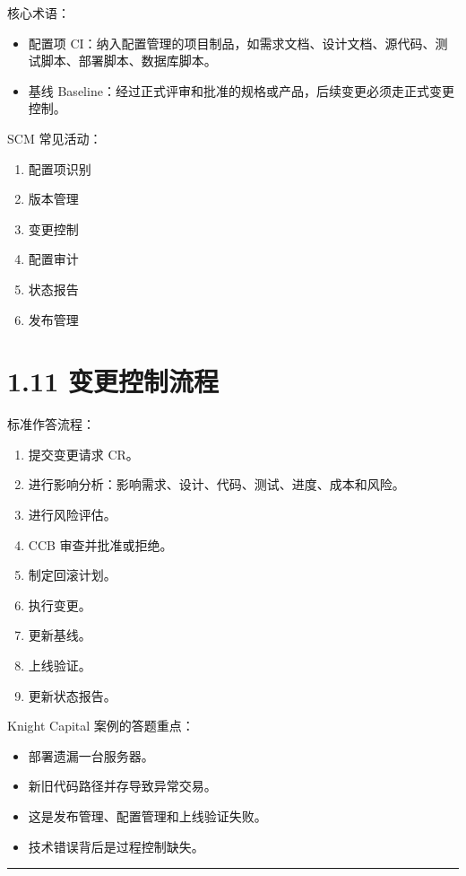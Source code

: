 \documentclass[UTF8,zihao=-4]{ctexart}
\begin{document}
核心术语：

\begin{itemize}
\item 配置项 CI：纳入配置管理的项目制品，如需求文档、设计文档、源代码、测试脚本、部署脚本、数据库脚本。
\item 基线 Baseline：经过正式评审和批准的规格或产品，后续变更必须走正式变更控制。
\end{itemize}

SCM 常见活动：

\begin{enumerate}
\item 配置项识别
\item 版本管理
\item 变更控制
\item 配置审计
\item 状态报告
\item 发布管理
\end{enumerate}

\section{1.11 变更控制流程}

标准作答流程：

\begin{enumerate}
\item 提交变更请求 CR。
\item 进行影响分析：影响需求、设计、代码、测试、进度、成本和风险。
\item 进行风险评估。
\item CCB 审查并批准或拒绝。
\item 制定回滚计划。
\item 执行变更。
\item 更新基线。
\item 上线验证。
\item 更新状态报告。
\end{enumerate}

Knight Capital 案例的答题重点：

\begin{itemize}
\item 部署遗漏一台服务器。
\item 新旧代码路径并存导致异常交易。
\item 这是发布管理、配置管理和上线验证失败。
\item 技术错误背后是过程控制缺失。
\end{itemize}

\bigskip\hrule\bigskip
\end{document}
